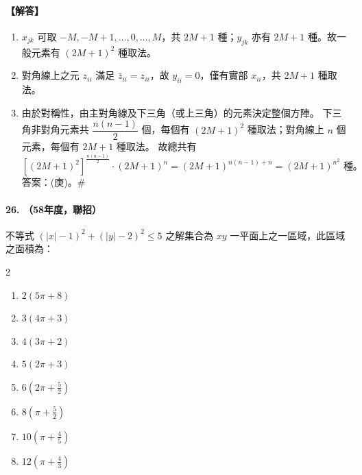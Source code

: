 \paragraph{【解答】}
\begin{enumerate}[label=\arabic*., leftmargin=2em]
  \item $x_{jk}$ 可取 $-M, -M+1, \dots, 0, \dots, M$，共 $2M+1$ 種；$y_{jk}$ 亦有 $2M+1$ 種。故一般元素有 $(2M+1)^2$ 種取法。
  \item 對角線上之元 $z_{ii}$ 滿足 $\bar{z}_{ii} = z_{ii}$，故 $y_{ii} = 0$，僅有實部 $x_{ii}$，共 $2M+1$ 種取法。
  \item 由於對稱性，由主對角線及下三角（或上三角）的元素決定整個方陣。
  下三角非對角元素共 $\dfrac{n(n-1)}{2}$ 個，每個有 $(2M+1)^2$ 種取法；對角線上 $n$ 個元素，每個有 $2M+1$ 種取法。
  故總共有
  \[ [(2M+1)^2]^{\frac{n(n-1)}{2}} \cdot (2M+1)^n = (2M+1)^{n(n-1)+n} = (2M+1)^{n^2} \text{ 種。} \]
  答案：(庚)。\hfill$\#$
\end{enumerate}

\paragraph{26. （58年度，聯招）}
不等式 $(|x|-1)^2 + (|y|-2)^2 \le 5$ 之解集合為 $xy$ 一平面上之一區域，此區域之面積為：
\begin{multicols}{2}
\begin{enumerate}[label=\tiangan*]
  \item $2(5\pi+8)$
  \item $3(4\pi+3)$
  \item $4(3\pi+2)$
  \item $5(2\pi+3)$
  \item $6\left(2\pi+\frac{5}{2}\right)$
  \item $8\left(\pi+\frac{5}{2}\right)$
  \item $10\left(\pi+\frac{4}{5}\right)$
  \item $12\left(\pi+\frac{4}{3}\right)$
\end{enumerate}
\end{multicols}

